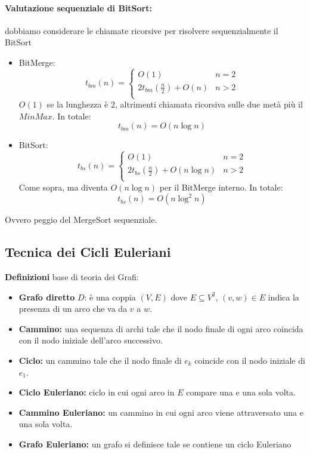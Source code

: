 \paragraph{Valutazione sequenziale di BitSort:} dobbiamo considerare le chiamate ricorsive per risolvere sequenzialmente il BitSort
\begin{itemize}
	\item BitMerge: 
	$$ t_{bm} (n) = \begin{cases}
		O(1) & n = 2 \\
		2 t_{bm} \left(\frac{n}{2}\right) + O(n) & n > 2 \\
	\end{cases}
	$$
	$O(1)$ se la lunghezza è 2, altrimenti chiamata ricorsiva sulle due metà più il $MinMax$. In totale:
	$$ t_{bm} (n) = O(n \log n) $$
	
	\item BitSort: 
	$$ t_{bs} (n)  = \begin{cases}
		O(1) & n = 2 \\
		2 t_{bs} \left(\frac{n}{2}\right) + O(n \log n) & n > 2 \\
	\end{cases}
	$$
	Come sopra, ma diventa $O(n \log n)$ per il BitMerge interno. In totale: 
	$$ t_{bs} (n) = O (n \log^2 n) $$
\end{itemize}
Ovvero peggio del MergeSort sequenziale. \\

\newpage


\subsection{Tecnica dei Cicli Euleriani}

\textbf{Definizioni} base di teoria dei Grafi: 
\begin{itemize}
	\item \textbf{Grafo diretto} $D$: è una coppia $(V,E)$ dove $E \subseteq V^2$, $(v,w) \in E$ indica la presenza di un arco che va da $v$ a $w$.\\
	
	\item \textbf{Cammino:} una sequenza di archi tale che il nodo finale di ogni arco coincida con il nodo iniziale dell'arco successivo.\\
	
	\item \textbf{Ciclo:} un cammino tale che il nodo finale di $e_k$ coincide con il nodo iniziale di $e_1$.\\
	
	\item \textbf{Ciclo Euleriano:} ciclo in cui ogni arco in $E$ compare una e una sola volta.\\
	
	\item \textbf{Cammino Euleriano:} un cammino in cui ogni arco viene attraversato una e una sola volta.\\
	
	\item \textbf{Grafo Euleriano:} un grafo si definisce tale se contiene un ciclo Euleriano
\end{itemize}

